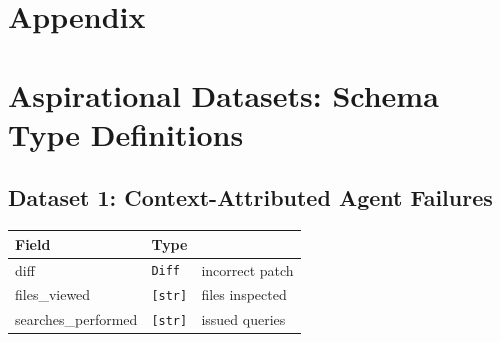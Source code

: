 \documentclass[a4paper,12pt]{article}
\begin{document}

%
%
%
%
%






%
%
%
%
%
\newpage
\appendix
\section*{Appendix}
\section{Aspirational Datasets: Schema Type Definitions}
\label{app:typedefs}

\subsection{Dataset 1: Context-Attributed Agent Failures}

\begin{tcolorbox}[title=AgentAttempt]
\footnotesize
\begin{tabularx}{\linewidth}{@{} l l Y @{}}
\toprule
\textbf{Field} & \textbf{Type} & \\
\midrule
diff & \texttt{Diff} & incorrect patch \\
files\_viewed & \texttt{[str]} & files inspected \\
searches\_performed & \texttt{[str]} & issued queries \\
\bottomrule
\end{tabularx}
\end{tcolorbox}
\end{document}
